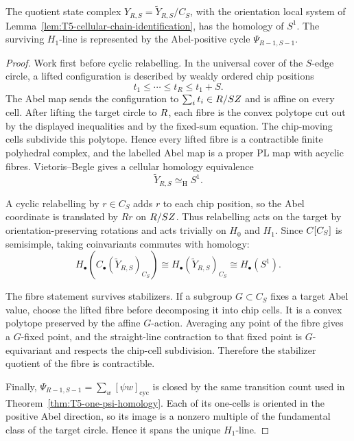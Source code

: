 \begin{lem}\label{lem:T5-abel-cyclic-stabilizers}
  The quotient state complex
  \(Y_{R,S}=\widetilde Y_{R,S}/C_S\), with the orientation local system
  of Lemma~\ref{lem:T5-cellular-chain-identification}, has the homology
  of \(S^1\).  The surviving \(H_1\)-line is represented by the
  Abel-positive cycle \(\Psi_{R-1,S-1}\).
\end{lem}

\begin{proof}
  Work first before cyclic relabelling.  In the universal cover of the
  \(S\)-edge circle, a lifted configuration is described by weakly
  ordered chip positions
  \[
    t_1\leq\cdots\leq t_R\leq t_1+S.
  \]
  The Abel map sends the configuration to
  \(\sum_i t_i\in R/SZ\) and is affine on every cell.  After lifting the
  target circle to \(R\), each fibre is the convex polytope cut out by
  the displayed inequalities and by the fixed-sum equation.  The
  chip-moving cells subdivide this polytope.  Hence every lifted fibre is
  a contractible finite polyhedral complex, and the labelled Abel map is a
  proper PL map with acyclic fibres.  Vietoris--Begle gives a cellular
  homology equivalence
  \[
    \widetilde Y_{R,S}\simeq_{\mathrm H} S^1 .
  \]

  A cyclic relabelling by \(r\in C_S\) adds \(r\) to each chip position,
  so the Abel coordinate is translated by \(Rr\) on \(R/SZ\).  Thus
  relabelling acts on the target by orientation-preserving rotations and
  acts trivially on \(H_0\) and \(H_1\).  Since \(C[C_S]\) is
  semisimple, taking coinvariants commutes with homology:
  \[
    H_\bullet(C_\bullet(\widetilde Y_{R,S})_{C_S})
      \cong H_\bullet(\widetilde Y_{R,S})_{C_S}
      \cong H_\bullet(S^1).
  \]

  The fibre statement survives stabilizers.  If a subgroup \(G\subset C_S\)
  fixes a target Abel value, choose the lifted fibre before decomposing it
  into chip cells.  It is a convex polytope preserved by the affine
  \(G\)-action.  Averaging any point of the fibre gives a \(G\)-fixed point,
  and the straight-line contraction to that fixed point is \(G\)-equivariant
  and respects the chip-cell subdivision.  Therefore the stabilizer quotient
  of the fibre is contractible.

  Finally, \(\Psi_{R-1,S-1}=\sum_w[\psi w]_{\mathrm{cyc}}\) is closed by
  the same transition count used in
  Theorem~\ref{thm:T5-one-psi-homology}.  Each of its one-cells is
  oriented in the positive Abel direction, so its image is a nonzero
  multiple of the fundamental class of the target circle.  Hence it
  spans the unique \(H_1\)-line.
\end{proof}

